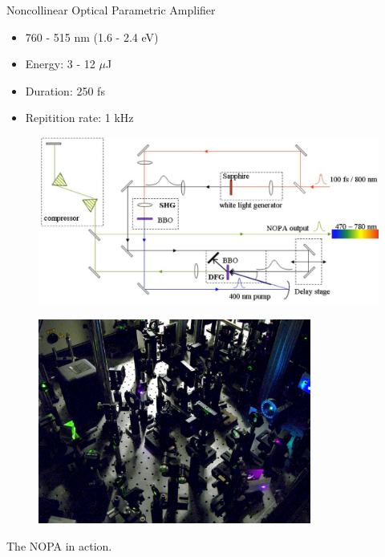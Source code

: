 \documentclass{beamer}
\begin{document}
\begin{frame}
\begin{block}{Noncollinear Optical Parametric Amplifier}
\begin{itemize}
\item 760 - 515 nm (1.6 - 2.4 eV)
\item Energy: 3 - 12 $\mu$J
\item Duration: 250 fs
\item Repitition rate: 1 kHz
\end{itemize}
\end{block}
\begin{figure}
\centering
\includegraphics[height=0.5\textheight]{nopa}
\end{figure}
\end{frame}

\begin{frame}
\begin{figure}
\centering
\includegraphics[width=0.8\textwidth]{nopa_pic}
\end{figure}
\begin{center}
The NOPA in action.
\end{center}
\end{frame}
\end{document}
